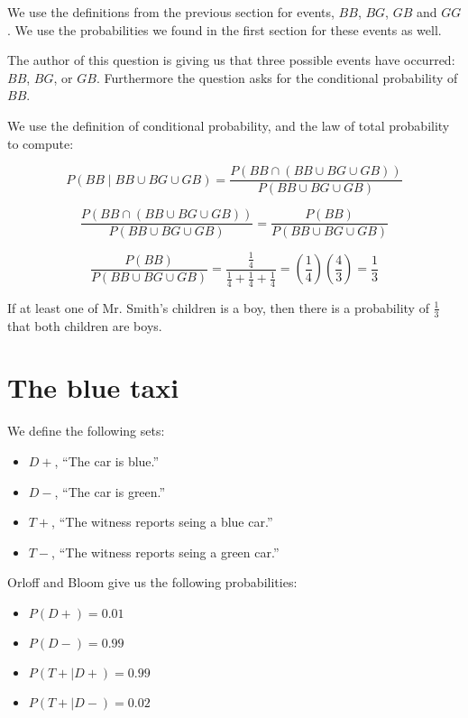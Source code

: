 \documentclass[a4paper,11pt]{article}
\begin{document}
We use the definitions from the previous section for events, $BB$, $BG$,
$GB$ and $GG$. We use the probabilities we found in the first section
for these events as well.

The  author of this question is giving us that three possible events
have occurred: $BB$, $BG$, or $GB$.  Furthermore the question asks
for the conditional probability of $BB$.

We use the definition of conditional probability, and the law of total
probability to compute:

\begin{equation}
P \left( BB \mid BB \cup BG \cup GB \right) 
= \frac{ P \left( BB \cap \left( BB \cup BG \cup GB \right) \right) }
  { P \left( BB \cup BG \cup GB \right) }
\end{equation}

\begin{equation}
\frac{ P \left( BB \cap \left( BB \cup BG \cup GB \right) \right) }
  { P \left( BB \cup BG \cup GB \right) }
= \frac{ P \left( BB \right)}
  { P \left( BB \cup BG \cup GB \right) }
\end{equation}

\begin{equation}
 \frac{ P \left( BB \right)}
  { P \left( BB \cup BG \cup GB \right) }
= \frac{ \frac{ 1}{4} }
  { \frac{1}{4} + \frac{1}{4} + \frac{1}{4}}
= \left( \frac{1}{4} \right) \left( \frac{4}{3} \right)
= \frac{1}{3}
\end{equation}

If at least one of Mr. Smith's children is a boy, then there is a 
probability of $\frac{1}{3}$ that both children are boys.

\section{The blue taxi}

We define the following sets:
  \begin{itemize}
  \item $D+$, ``The car is blue.''
  \item $D-$, ``The car is green.''
  \item $T+$, ``The witness reports seing a blue car.''
  \item $T-$, ``The witness reports seing a green car.''
\end{itemize}

Orloff and Bloom give us the following probabilities:

\begin{itemize}
  \item $P \left( D+ \right) = 0.01$
  \item $P \left( D- \right) = 0.99$
  \item $P \left( T+ \mid D+ \right) = 0.99$
  \item $P \left( T+ \mid D- \right) = 0.02$
\end{itemize}
\end{document}

